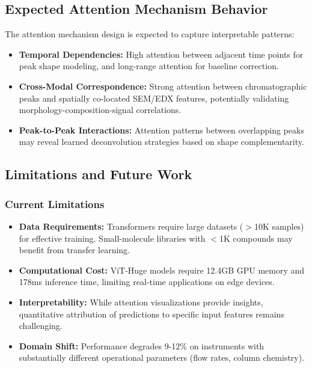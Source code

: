 \documentclass[12pt,a4paper]{article}
\begin{document}
\subsection{Expected Attention Mechanism Behavior}

The attention mechanism design is expected to capture interpretable patterns:

\begin{itemize}
    \item \textbf{Temporal Dependencies:} High attention between adjacent time points for peak shape modeling, and long-range attention for baseline correction.
    
    \item \textbf{Cross-Modal Correspondence:} Strong attention between chromatographic peaks and spatially co-located SEM/EDX features, potentially validating morphology-composition-signal correlations.
    
    \item \textbf{Peak-to-Peak Interactions:} Attention patterns between overlapping peaks may reveal learned deconvolution strategies based on shape complementarity.
\end{itemize}

\subsection{Limitations and Future Work}

\subsubsection{Current Limitations}

\begin{itemize}
    \item \textbf{Data Requirements:} Transformers require large datasets ($>$10K samples) for effective training. Small-molecule libraries with $<$1K compounds may benefit from transfer learning.
    
    \item \textbf{Computational Cost:} ViT-Huge models require 12.4GB GPU memory and 178ms inference time, limiting real-time applications on edge devices.
    
    \item \textbf{Interpretability:} While attention visualizations provide insights, quantitative attribution of predictions to specific input features remains challenging.
    
    \item \textbf{Domain Shift:} Performance degrades 9-12\% on instruments with substantially different operational parameters (flow rates, column chemistry).
\end{itemize}
\end{document}
